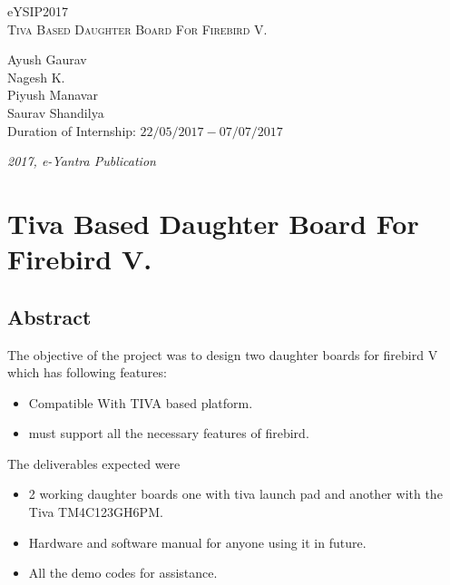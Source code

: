 \documentclass[a4paper,12pt,oneside]{book}
\begin{document}
\begin{titlepage}
\raggedright
{\Large eYSIP2017\\[1cm]}
{\Huge\scshape Tiva Based Daughter Board For Firebird V.  \\[.1in]}
\vfill
\begin{flushright}
{\large Ayush Gaurav \\}
{\large Nagesh K. \\}
{\large Piyush Manavar \\}
{\large Saurav Shandilya \\}
{\large Duration of Internship: $ 22/05/2017-07/07/2017 $ \\}
\end{flushright}
{\itshape 2017, e-Yantra Publication}
\end{titlepage}

\chapter[Project Tag]{Tiva Based Daughter Board For Firebird V.}
\section*{Abstract}
The objective of the project was to design two daughter boards for firebird V
which has following features:
\begin{itemize}
	\item  Compatible With TIVA based platform.
	\item must support all the necessary features of firebird.
\end{itemize}
The deliverables expected were
\begin{itemize}
	\item 2 working daughter boards one with tiva launch pad and another with the Tiva TM4C123GH6PM.
	\item Hardware and software manual for anyone using it in future.
	\item All the demo codes for assistance.
\end{itemize}
\end{document}
